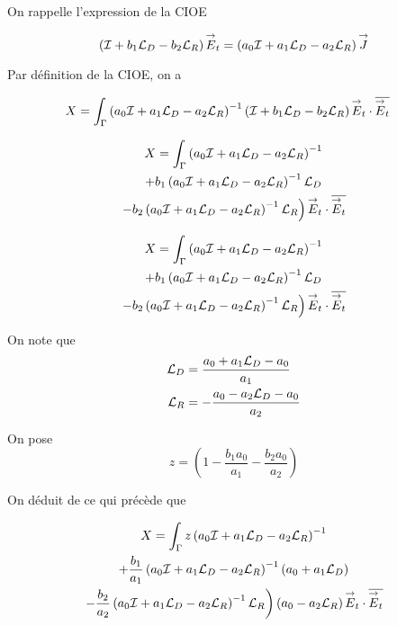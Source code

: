   On rappelle l'expression de la CIOE

  \begin{equation}
    \left(\oI + b_1 \LD - b_2 \LR \right) \vE_t = \left(a_0\oI + a_1 \LD - a_2 \LR \right) \vJ
  \end{equation}

  Par définition de la CIOE, on a

  \begin{align}
    X &= \int_\Gamma \left(a_0\oI + a_1 \LD - a_2 \LR \right)^{-1}\left(\oI + b_1 \LD - b_2 \LR \right) \vE_t\cdot \conj{\vE_t}
  \end{align}

  \begin{multline}
    X = \int_\Gamma \left(a_0\oI + a_1 \LD - a_2 \LR \right)^{-1}
    \\
    + b_1 \left(a_0\oI + a_1 \LD - a_2 \LR \right)^{-1}\LD
    \\
    \left.
    - b_2 \left(a_0\oI + a_1 \LD - a_2 \LR \right)^{-1}\LR \right) \vE_t\cdot \conj{\vE_t}
  \end{multline}

  \begin{multline}
    X = \int_\Gamma \left(a_0\oI + a_1 \LD - a_2 \LR \right)^{-1}
    \\
    + b_1 \left(a_0\oI + a_1 \LD - a_2 \LR \right)^{-1}\LD
    \\
    \left.
    - b_2 \left(a_0\oI + a_1 \LD - a_2 \LR \right)^{-1}\LR \right) \vE_t\cdot \conj{\vE_t}
  \end{multline}

  On note que
  \begin{align}
    \LD & = \frac{a_0 + a_1 \LD - a_0}{a_1}
    \\
    \LR & = -\frac{a_0 - a_2 \LD - a_0}{a_2}
  \end{align}

  On pose
  \begin{equation}
    z = \left(1 - \frac{b_1a_0}{a_1} - \frac{b_2a_0}{a_2}\right)
  \end{equation}

  On déduit de ce qui précède que

  \begin{multline}
    X = \int_\Gamma z\left(a_0\oI + a_1 \LD - a_2 \LR \right)^{-1}
    \\
    + \frac{b_1}{a_1} \left(a_0\oI + a_1 \LD - a_2 \LR \right)^{-1}\left(a_0+a_1\LD\right)
    \\
    \left.
    - \frac{b_2}{a_2} \left(a_0\oI + a_1 \LD - a_2 \LR \right)^{-1}\LR \right)\left(a_0-a_2\LR\right) \vE_t\cdot \conj{\vE_t}
  \end{multline}

